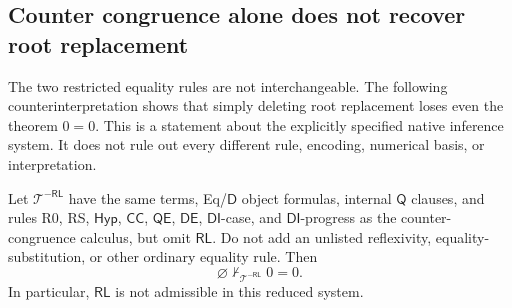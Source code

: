 
\subsection{Counter congruence alone does not recover root replacement}
\label{rootind:section}

The two restricted equality rules are not interchangeable. The following
counterinterpretation shows that simply deleting root replacement loses
even the theorem $0=0$. This is a statement about the explicitly specified
native inference system. It does not rule out every different rule,
encoding, numerical basis, or interpretation.

\begin{theorem}
\label{rootind:theorem}
Let $\mathcal T^{-\mathsf{RL}}$ have the same terms, Eq/$\mathsf D$
object formulas, internal $\mathsf Q$ clauses, and rules R0, RS,
$\mathsf{Hyp}$, $\mathsf{CC}$, $\mathsf{QE}$, $\mathsf{DE}$,
$\mathsf{DI}$-case, and $\mathsf{DI}$-progress as the counter-congruence
calculus, but omit $\mathsf{RL}$. Do not add an unlisted reflexivity,
equality-substitution, or other ordinary equality rule. Then
\[
                    \varnothing\nvdash_{\mathcal T^{-\mathsf{RL}}}0=0.
\]
In particular, $\mathsf{RL}$ is not admissible in this reduced system.
\end{theorem}
